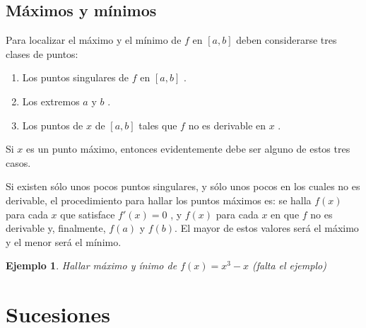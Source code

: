 \documentclass[14pt,a4paper]{extarticle}
\newtheorem{ejs}{Ejemplo}[section]
\begin{document}
\subsection{M\'aximos y m\'inimos}
Para localizar el m\'aximo y el m\'inimo de \( f \) en \( [a,b] \)  deben considerarse
tres clases de puntos:

\begin{enumerate}
\item Los puntos singulares de \( f \) en \( [a,b] \) .
\item Los extremos \( a \) y \( b \) .
\item Los puntos de \( x \)  de \( [a,b] \)  tales que \( f \) no es
  derivable en \( x \) .
\end{enumerate}

Si \( x \) es un punto m\'aximo, entonces evidentemente debe ser
alguno de estos tres casos.

Si existen s\'olo unos pocos puntos singulares, y s\'olo unos pocos en
los cuales no es derivable, el procedimiento para hallar los puntos
m\'aximos es: se halla \( f(x) \) para cada \( x \) que satisface \(
f'(x)=0 \) , y \( f(x) \) para cada \( x \) en que \( f \) no es
derivable y, finalmente, \( f(a) \) y \( f(b) \). El mayor de estos
valores ser\'a el m\'aximo y el menor ser\'a el m\'inimo.

\begin{ejs}{Hallar m\'aximo y \'inimo de \( f(x)=x^3-x \)}
(falta el ejemplo)
\end{ejs}


\section{Sucesiones}
\end{document}
